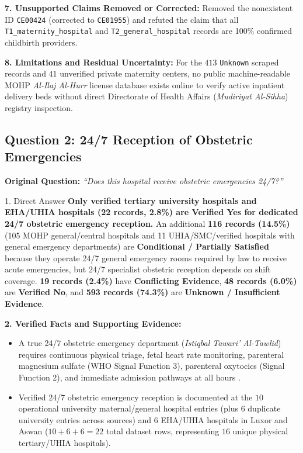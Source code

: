 \documentclass[10pt,a4paper]{article}
\begin{document}
\textbf{7. Unsupported Claims Removed or Corrected:}
Removed the nonexistent ID \texttt{CE00424} (corrected to \texttt{CE01955}) and refuted the claim that all \texttt{T1\_maternity\_hospital} and \texttt{T2\_general\_hospital} records are 100\% confirmed childbirth providers.

\textbf{8. Limitations and Residual Uncertainty:}
For the $413$ \texttt{Unknown} scraped records and $41$ unverified private maternity centers, no public machine-readable MOHP \textit{Al-Ilaj Al-Hurr} license database exists online to verify active inpatient delivery beds without direct Directorate of Health Affairs (\textit{Mudiriyat Al-Sihha}) registry inspection.

\subsection{Question 2: 24/7 Reception of Obstetric Emergencies}
\textbf{Original Question:} \textit{``Does this hospital receive obstetric emergencies 24/7?''}

\begin{auditbox}{1. Direct Answer}
\textbf{Only verified tertiary university hospitals and EHA/UHIA hospitals (22 records, 2.8\%) are Verified Yes for dedicated 24/7 obstetric emergency reception.} An additional \textbf{116 records (14.5\%)} (105 MOHP general/central hospitals and 11 UHIA/SMC/verified hospitals with general emergency departments) are \textbf{Conditional / Partially Satisfied} because they operate 24/7 general emergency rooms required by law to receive acute emergencies, but 24/7 specialist obstetric reception depends on shift coverage. \textbf{19 records (2.4\%)} have \textbf{Conflicting Evidence}, \textbf{48 records (6.0\%)} are \textbf{Verified No}, and \textbf{593 records (74.3\%)} are \textbf{Unknown / Insufficient Evidence}.
\end{auditbox}

\textbf{2. Verified Facts and Supporting Evidence:}
\begin{itemize}
    \item A true 24/7 obstetric emergency department (\textit{Istiqbal Tawari' Al-Tawlid}) requires continuous physical triage, fetal heart rate monitoring, parenteral magnesium sulfate (WHO Signal Function 3), parenteral oxytocics (Signal Function 2), and immediate admission pathways at all hours \cite{who2009emonc}.
    \item Verified 24/7 obstetric emergency reception is documented at the $10$ operational university maternal/general hospital entries (plus $6$ duplicate university entries across sources) and $6$ EHA/UHIA hospitals in Luxor and Aswan ($10 + 6 + 6 = 22$ total dataset rows, representing $16$ unique physical tertiary/UHIA hospitals).
\end{itemize}
\end{document}
